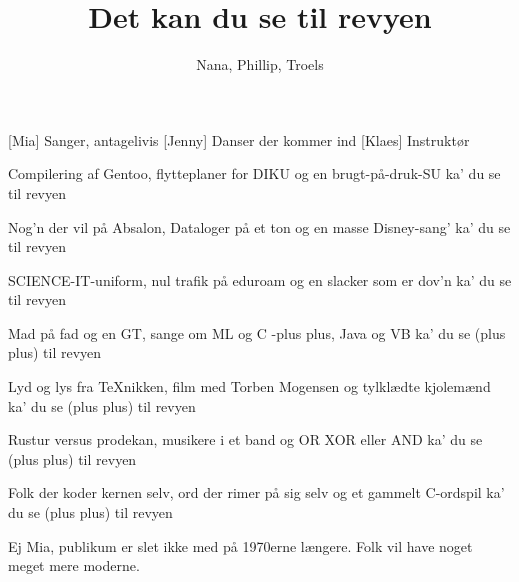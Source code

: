\documentclass[a4paper,11pt]{article}
\title{Det kan du se til revyen}
\author{Nana, Phillip, Troels}
\begin{document}
\maketitle

\begin{roles}
[Mia] Sanger, antagelivis
[Jenny] Danser der kommer ind
[Klaes] Instruktør
\end{roles}

\begin{song}

Compilering af Gentoo,
flytteplaner for DIKU
og en brugt-på-druk-SU
ka' du se til revyen

Nog'n der vil på Absalon,
Dataloger på et ton
og en masse Disney-sang'
ka' du se til revyen

SCIENCE-IT-uniform,
nul trafik på eduroam
og en slacker som er dov'n
ka' du se til revyen

Mad på fad og en GT,
sange om ML og C
-plus plus, Java og VB
ka' du se (plus plus) til revyen

Lyd og lys fra TeXnikken,
film med Torben Mogensen
og tylklædte kjolemænd
ka' du se (plus plus) til revyen

Rustur versus prodekan,
musikere i et band
og OR XOR eller AND
ka' du se (plus plus) til revyen

Folk der koder kernen selv,
ord der rimer på sig selv
og et gammelt C-ordspil
ka' du se (plus plus) til revyen

\end{song}

\begin{sketch}


 Ej Mia, publikum er slet ikke med på 1970erne længere.  Folk vil have noget meget mere moderne.


\end{sketch}
\end{document}
